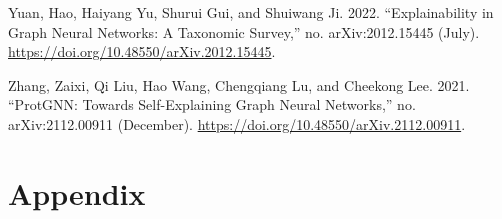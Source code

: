 \documentclass[
  11pt,
  letterpaper,
]{article}
\newlength{\cslhangindent}
\newlength{\cslentryspacingunit} %
\newenvironment{CSLReferences}[2] %
 {%
  \setlength{\parindent}{0pt}
  \ifodd #1
  \let\oldpar\par
  \def\par{\hangindent=\cslhangindent\oldpar}
  \fi
  \setlength{\parskip}{#2\cslentryspacingunit}
 }%
 {}
\begin{document}
\begin{CSLReferences}{1}{0}
\leavevmode{}%
Yuan, Hao, Haiyang Yu, Shurui Gui, and Shuiwang Ji. 2022.
{``Explainability in Graph Neural Networks: A Taxonomic Survey,''} no.
arXiv:2012.15445 (July).
\url{https://doi.org/10.48550/arXiv.2012.15445}.

\leavevmode{}%
Zhang, Zaixi, Qi Liu, Hao Wang, Chengqiang Lu, and Cheekong Lee. 2021.
{``ProtGNN: Towards Self-Explaining Graph Neural Networks,''} no.
arXiv:2112.00911 (December).
\url{https://doi.org/10.48550/arXiv.2112.00911}.

\end{CSLReferences}

\hypertarget{appendix}{%
\section{Appendix}\label{appendix}}
\end{document}
